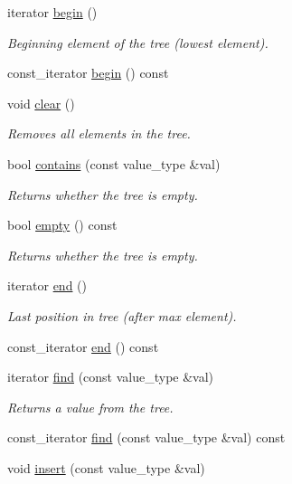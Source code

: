 \begin{DoxyCompactItemize}
iterator \hyperlink{class_a_v_l_tree_a65acff2e86e46d2a99b52df98f2a1713}{begin} ()
\begin{DoxyCompactList}\small\item\em Beginning element of the tree (lowest element). \end{DoxyCompactList}\item 
const\+\_\+iterator \hyperlink{class_a_v_l_tree_a727c82149d7a4336c226befbdd6e2ae3}{begin} () const 
\item 
void \hyperlink{class_a_v_l_tree_ad79395d1467b80703d47e1c272024b9d}{clear} ()
\begin{DoxyCompactList}\small\item\em Removes all elements in the tree. \end{DoxyCompactList}\item 
bool \hyperlink{class_a_v_l_tree_a73c6aeccc0c4192ffa6fc469c10e852e}{contains} (const value\+\_\+type \&val)
\begin{DoxyCompactList}\small\item\em Returns whether the tree is empty. \end{DoxyCompactList}\item 
bool \hyperlink{class_a_v_l_tree_a80576afed5890eb0295e98b60db75ab4}{empty} () const 
\begin{DoxyCompactList}\small\item\em Returns whether the tree is empty. \end{DoxyCompactList}\item 
iterator \hyperlink{class_a_v_l_tree_af636ba0f814af8a79ed120bd5bfac310}{end} ()
\begin{DoxyCompactList}\small\item\em Last position in tree (after max element). \end{DoxyCompactList}\item 
const\+\_\+iterator \hyperlink{class_a_v_l_tree_a51190d0f736c44522292a6931e2a45f2}{end} () const 
\item 
iterator \hyperlink{class_a_v_l_tree_a853f57000e0cf3f2d9ef5fbbc3223e60}{find} (const value\+\_\+type \&val)
\begin{DoxyCompactList}\small\item\em Returns a value from the tree. \end{DoxyCompactList}\item 
const\+\_\+iterator \hyperlink{class_a_v_l_tree_a0b11c1f2ca86904dcfe4d7d710e253f1}{find} (const value\+\_\+type \&val) const 
\item 
void \hyperlink{class_a_v_l_tree_a8da12b14718d64a6ddc6cd8e7470b03e}{insert} (const value\+\_\+type \&val)

\end{DoxyCompactItemize}
